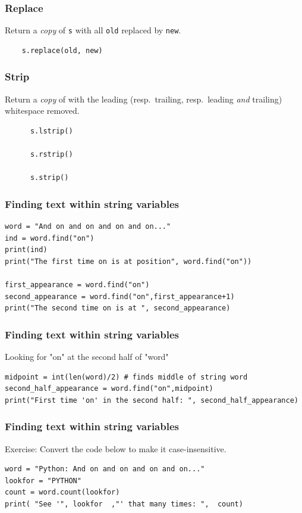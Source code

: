 \begin{frame}[fragile]\frametitle{Replace}
    Return a \emph{copy} of \texttt{s} with all \texttt{old} replaced by \texttt{new}.
  \begin{lstlisting}
  	s.replace(old, new)
  \end{lstlisting}
\end{frame}

\begin{frame}[fragile]\frametitle{Strip}
    Return a \emph{copy} of with the leading (resp.\ trailing, resp.\ leading \emph{and} trailing) whitespace removed.
  \begin{lstlisting}
      s.lstrip()

      s.rstrip()

      s.strip()
  \end{lstlisting}

\end{frame}


\begin{frame}[fragile]\frametitle{Finding text within string variables}
\begin{lstlisting}
word = "And on and on and on and on..." 
ind = word.find("on")
print(ind)
print("The first time on is at position", word.find("on"))

first_appearance = word.find("on")
second_appearance = word.find("on",first_appearance+1)
print("The second time on is at ", second_appearance)
\end{lstlisting}
\end{frame}


\begin{frame}[fragile]\frametitle{Finding text within string variables}
 Looking for "on" at the second half of "word"
\begin{lstlisting}
midpoint = int(len(word)/2) # finds middle of string word
second_half_appearance = word.find("on",midpoint)
print("First time 'on' in the second half: ", second_half_appearance)
\end{lstlisting}

\end{frame}


\begin{frame}[fragile]\frametitle{Finding text within string variables}
Exercise: Convert the code below to make it case-insensitive.
\begin{lstlisting}
word = "Python: And on and on and on and on..."
lookfor = "PYTHON"
count = word.count(lookfor)
print( "See '", lookfor  ,"' that many times: ",  count)
\end{lstlisting}
\end{frame}


